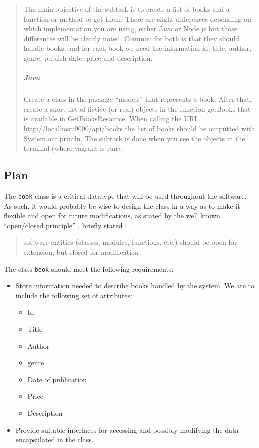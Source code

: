 \begin{quote}
  The main objective of the subtask is to create a list of books and a function
  or method to get them. There are slight differences depending on which
  implementation you are using, either Java or Node.js but those differences
  will be clearly noted. Common for both is that they should handle books,
  and for each book we need the information id, title, author, genre, publish
  date, price and description.

  \subparagraph{Java}
  Create a class in the package ``models'' that represents a book. After
  that, create a short list of fictive (or real) objects in the function
  getBooks that is available in GetBooksResource. When calling the URL
  http://localhost:9090/api/books the list of books should be outputted
  with System.out.println. The subtask is done when you see the objects in
  the terminal (where vagrant is run).
\end{quote}


\subsection{Plan}\label{task-1a-plan}
The \texttt{book} class is a critical datatype that will be used throughout the
software. As such, it would probably be wise to design the class in a way as 
to make it flexible and open for future modifications, as stated by the well known
``open/closed principle'' \cite{SOLID:OCP}, briefly stated \cite{SOLID:OCP:Meyer}:

\begin{quote}
  software entities (classes, modules, functions, etc.) should be open for
  extension, but closed for modification
\end{quote}


The class \texttt{book} should meet the following requirements:

\begin{itemize}
  \item Store information needed to describe books handled by the system.
        We are to include the following set of attributes:

  \begin{itemize}
    \item Id
    \item Title
    \item Author
    \item genre
    \item Date of publication
    \item Price
    \item Description
  \end{itemize}

  \item Provide suitable interfaces for accessing and possibly modifying the 
        data encapsulated in the class.
\end{itemize}

